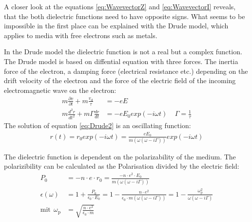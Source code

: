 \documentclass[twoside,english,headsepline=on,DIV=12]{scrartcl}
\numberwithin{equation}{section}
\begin{document}
A closer look at the equations \ref{eq:WavevectorZ} and \ref{eq:WavevectorI} reveals, that the both dielectric functions need to have opposite signs. What seems to be impossible in the first place can be explained with the Drude model, which applies to media with free electrons such as metals. 

In the Drude model the dielectric function is not a real but a complex function. The Drude model is based on diffential equation with three forces. The inertia force of the electron, a damping force (electrical resistance etc.) depending on the drift velocity of the electron and the force of the electric field of the incoming electromagnetic wave on the electron:
\begin{align}
m \frac{\partial v}{\partial t} + m \frac{v_\text{d}}{\tau} &= -e E \label{eq:Drude1} \\
m \frac{d^2 r}{dt^2} + m \Gamma \frac{dr}{dt} &= -e E_0 exp(-i \omega t) \label{eq:Drude2} \ \ \ \ \ \Gamma = \frac{1}{\tau}
\end{align}
The solution of equation \ref{eq:Drude2} is an oscillating function:
\begin{align}
r(t) = r_0 exp(-i \omega t) = \frac{e E_0}{m(\omega(\omega - i \Gamma))} exp(-i \omega t) \label{eq:DrudeSolution}
\end{align}

The dielectric function is dependent on the polarizability of the medium. The polarizibility can be calculated as the Polarisation divided by the electric field:
\begin{align}
P_0 &= -n \cdot e \cdot r_0 = \frac{-n \cdot e^2 \cdot E_0}{m(\omega(\omega - i \Gamma))} \label{eq:Polarisation} \\
\epsilon (\omega) &= 1 + \frac{P_0}{\epsilon_0 \cdot E_0} = 1 - \frac{n \cdot e^2}{\epsilon_0 \cdot m(\omega(\omega - i \Gamma))} = 1 - \frac{\omega_\text{p}^2}{\omega(\omega - i \Gamma)} \label{eq:DielectricFunction} \\
\text{mit} \ \ \omega_\text{p}& = \sqrt{\frac{n \cdot e^2}{\epsilon_0 \cdot m}} \label{eq:PlasmaFrequency}
\end{align}
\end{document}
